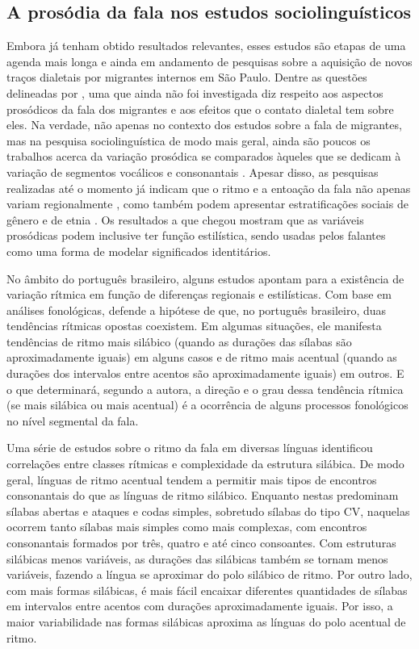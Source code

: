 \documentclass[
			a4paper,		%
			12pt,			%
			oneside,
			]{article}		%
\begin{document}
	\subsection{A prosódia da fala nos estudos sociolinguísticos}
		
Embora já tenham obtido resultados relevantes, esses estudos são etapas de uma agenda 
mais longa e ainda em andamento de pesquisas sobre a aquisição de novos traços dialetais 
por migrantes internos em São Paulo. Dentre as questões delineadas por 
\citet{Oushiro2018}, uma que ainda não foi investigada diz respeito aos aspectos 
prosódicos da fala dos migrantes e aos efeitos que o contato dialetal tem sobre eles. Na 
verdade, não apenas no contexto dos estudos sobre a fala de migrantes, mas na pesquisa 
sociolinguística de modo mais geral, ainda são poucos os trabalhos acerca da variação 
prosódica se comparados àqueles que se dedicam à variação de segmentos vocálicos e 
consonantais \citep{Thomas2013, Hay.Drager2007}. Apesar disso, as pesquisas realizadas 
até o momento já indicam que o ritmo e a entoação da fala não apenas variam regionalmente 
\citep{Clopper.Smiljanic2015, Grabe.etal2000}, como também podem apresentar 
estratificações sociais de gênero \citep{Lowry2011} e de etnia \citep{Thomas2013, 
Szakay2006}. Os resultados a que \citet{Podesva2011} chegou mostram que as variáveis 
prosódicas podem inclusive ter função estilística, sendo usadas pelos falantes como uma 
forma de modelar significados identitários.

No âmbito do português brasileiro, alguns estudos apontam para a existência de variação 
rítmica em função de diferenças regionais e estilísticas. Com base em análises 
fonológicas, \citet{Abaurre-Gnerre1981} defende a hipótese de que, no português 
brasileiro, duas tendências rítmicas opostas coexistem. Em algumas situações, ele 
manifesta tendências de ritmo mais silábico (quando as durações das sílabas são 
aproximadamente iguais) em alguns casos e de ritmo mais acentual (quando as durações dos 
intervalos entre acentos são aproximadamente iguais) em outros. E o que determinará, 
segundo a autora, a direção e o grau dessa tendência rítmica (se mais silábica ou mais 
acentual) é a ocorrência de alguns processos fonológicos no nível segmental da fala.

Uma série de estudos sobre o ritmo da fala em diversas línguas identificou correlações 
entre classes rítmicas e complexidade da estrutura silábica. De modo geral, línguas de 
ritmo acentual tendem a permitir mais tipos de encontros consonantais do que as línguas 
de ritmo silábico. Enquanto nestas predominam sílabas abertas e ataques e codas simples, 
sobretudo sílabas do tipo CV, naquelas ocorrem tanto sílabas mais simples como mais 
complexas, com encontros consonantais formados por três, quatro e até cinco consoantes. 
Com estruturas silábicas menos variáveis, as durações das silábicas também se tornam 
menos variáveis, fazendo a língua se aproximar do polo silábico de ritmo. Por outro lado, 
com mais formas silábicas, é mais fácil encaixar diferentes quantidades de sílabas em 
intervalos entre acentos com durações aproximadamente iguais. Por isso, a maior 
variabilidade nas formas silábicas aproxima as línguas do polo acentual de ritmo.
\end{document}
